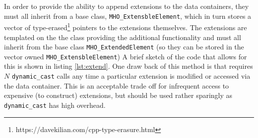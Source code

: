 In order to provide the ability to append extensions to the data containers, they must all inherit from a base class, \texttt{MHO\_ExtensbleElement}, which
in turn stores a vector of type-erased\footnote{https://davekilian.com/cpp-type-erasure.html} pointers to the extensions themselves. The extensions are templated on the the class providing the additional functionality and must all inherit from the base class \texttt{MHO\_ExtendedElement} (so they can be stored in the vector owned \texttt{MHO\_ExtensbleElement}) A brief sketch of the code that allows for this is shown in listing \ref{lst:extend}. One draw back of this method is that requires $N$ \texttt{dynamic\_cast} calls any time a particular extension is modified or accessed via the data container. 
This is an acceptable trade off for infrequent access to expensive (to construct) extensions, but should be used rather sparingly as \texttt{dynamic\_cast} has high overhead.


